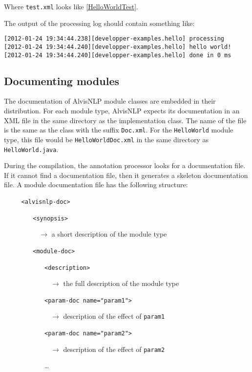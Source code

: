 \documentclass[a4paper]{article}
\begin{document}
Where \texttt{test.xml} looks like \ref{HelloWorldTest}.


The output of the processing log should contain something like:

\begin{verbatim}
[2012-01-24 19:34:44.238][developper-examples.hello] processing
[2012-01-24 19:34:44.240][developper-examples.hello] hello world!
[2012-01-24 19:34:44.240][developper-examples.hello] done in 0 ms
\end{verbatim}

\subsection{Documenting modules}
The documentation of AlvisNLP module classes are embedded in their distribution.
For each module type, AlvisNLP expects its documentation in an XML file in the same directory as the implementation class.
The name of the file is the same as the class with the suffix \texttt{Doc.xml}.
For the \texttt{HelloWorld} module type, this file would be \texttt{HelloWorldDoc.xml} in the same directory as \texttt{HelloWorld.java}.

During the compilation, the annotation processor looks for a documentation file.
If it cannot find a documentation file, then it generates a skeleton documentation file.
A module documentation file has the following structure:
\begin{itemize}
\item[~] \texttt{<alvisnlp-doc>}
  \begin{itemize}
  \item[~] \texttt{<synopsis>}
    \begin{itemize}
    \item[$\rightarrow$] a short description of the module type
    \end{itemize}
  \item[~] \texttt{<module-doc>}
    \begin{itemize}
    \item[~] \texttt{<description>}
      \begin{itemize}
      \item[$\rightarrow$] the full description of the module type
      \end{itemize}
    \item[~] \texttt{<param-doc name="param1">}
      \begin{itemize}
      \item[$\rightarrow$] description of the effect of \texttt{param1}
      \end{itemize}
    \item[~] \texttt{<param-doc name="param2">}
      \begin{itemize}
      \item[$\rightarrow$] description of the effect of \texttt{param2}
      \end{itemize}
    \item[~] \ldots
    \end{itemize}
  \end{itemize}
\end{itemize}
\end{document}
